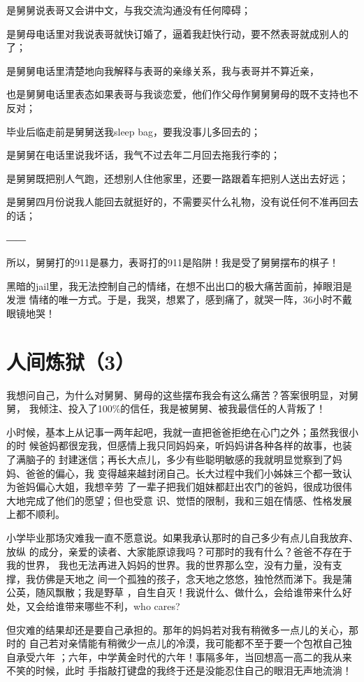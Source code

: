 \documentclass[12pt]{book}
\begin{document}
是舅舅说表哥又会讲中文，与我交流沟通没有任何障碍；

是舅母电话里对我说表哥就快订婚了，逼着我赶快行动，要不然表哥就成别人的了；

是舅舅电话里清楚地向我解释与表哥的亲缘关系，我与表哥并不算近亲，

也是舅舅电话里表态如果表哥与我谈恋爱，他们作父母作舅舅舅母的既不支持也不反对；

毕业后临走前是舅舅送我sleep bag，要我没事儿多回去的；

是舅舅在电话里说我坏话，我气不过去年二月回去拖我行李的；

是舅舅既把别人气跑，还想别人住他家里，还要一路跟着车把别人送出去好远；

是舅舅四月份说我人能回去就挺好的，不需要买什么礼物，没有说任何不准再回去的话；

――

所以，舅舅打的911是暴力，表哥打的911是陷阱！我是受了舅舅摆布的棋子！

黑暗的jail里，我无法控制自己的情绪，在想不出出口的极大痛苦面前，掉眼泪是发泄
情绪的唯一方式。于是，我哭，想累了，感到痛了，就哭一阵，36小时不戴眼镜地哭！
\section{人间炼狱（3）}
\label{sec-10-3}

我想问自己，为什么对舅舅、舅母的这些摆布我会有这么痛苦？答案很明显，对舅舅，
我倾注、投入了100\%的信任，我是被舅舅、被我最信任的人背叛了！

小时候，基本上从记事一两年起吧，我就一直把爸爸拒绝在心门之外；虽然我很小的时
候爸妈都很宠我，但感情上我只同妈妈亲，听妈妈讲各种各样的故事，也装了满脑子的
封建迷信；再长大点儿，多少有些聪明敏感的我就明显觉察到了妈妈、爸爸的偏心，我
变得越来越封闭自己。长大过程中我们小姊妹三个都一致认为爸妈偏心大姐，我想辛劳
了一辈子把我们姐妹都赶出农门的爸妈，很成功很伟大地完成了他们的愿望；但也受意
识、觉悟的限制，我和三姐在情感、性格发展上都不顺利。

小学毕业那场灾难我一直不愿意说。如果我承认那时的自己多少有点儿自我放弃、放纵
的成分，亲爱的读者、大家能原谅我吗？可那时的我有什么？爸爸不存在于我的世界，
我也无法再进入妈妈的世界。我的世界那么空，没有力量，没有支撑，我仿佛是天地之
间一个孤独的孩子，念天地之悠悠，独怆然而涕下。我是蒲公英，随风飘散；我是野草
，自生自灭！我说什么、做什么，会给谁带来什么好处，又会给谁带来哪些不利，who 
cares?

但灾难的结果却还是要自己承担的。那年的妈妈若对我有稍微多一点儿的关心，那时的
自己若对亲情能有稍微少一点儿的冷漠，我可能都不至于要一个包袱自己独自承受六年
；六年，中学黄金时代的六年！事隔多年，当回想高一高二的我从来不笑的时候，此时
手指敲打键盘的我终于还是没能忍住自己的眼泪无声地流淌！
\end{document}
